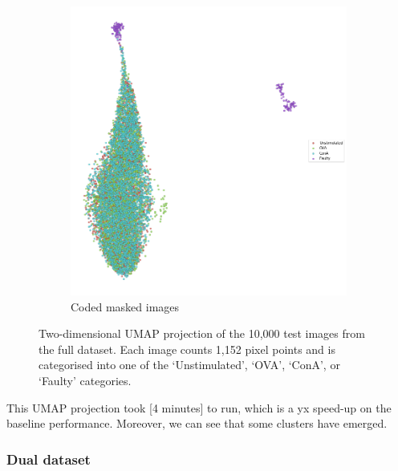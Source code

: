 \begin{figure}[h!]
\begin{subfigure}[h!]{0.45\textwidth}
        \includegraphics[width=\textwidth]{dissertation/figures/CK19_baseline_visualisation.png}
        \caption{Coded masked images}
    \end{subfigure}
    \caption{Two-dimensional UMAP projection of the 10,000 test images from the full dataset. Each image counts 1,152 pixel points and is categorised into one of the `Unstimulated', `OVA', `ConA', or `Faulty' categories.}
    \label{fig:my_label}
\end{figure}

This UMAP projection took [4 minutes] to run, which is a yx speed-up on the baseline performance. Moreover, we can see that some clusters have emerged.

\bigskip
\subsubsection{Dual dataset}
\hfill
\hfill

